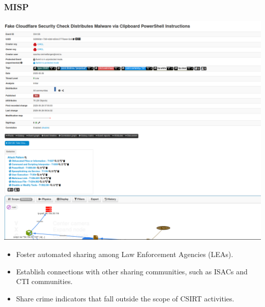 \begin{frame}
    \frametitle{MISP}
    \begin{minipage}{0.45\textwidth} %
        \includegraphics[scale=0.3]{img/misp-scaled.png}
    \end{minipage}%
    \hfill
    \begin{minipage}{0.45\textwidth} %
        \begin{itemize}
            \item Foster automated sharing among Law Enforcement Agencies (LEAs).
            \item Establish connections with other sharing communities, such as ISACs and CTI communities.
            \item Share crime indicators that fall outside the scope of CSIRT activities.
        \end{itemize}
    \end{minipage}
\end{frame}


